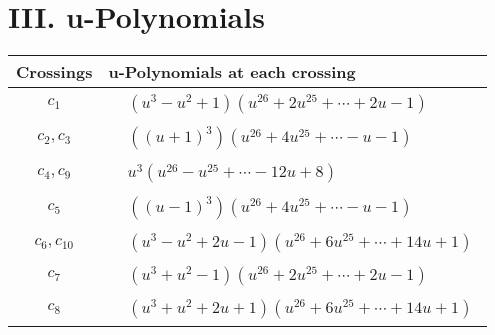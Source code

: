 \documentclass[1p]{elsarticle_modified}
\theoremstyle{definition}
\begin{document}
\newpage\renewcommand{\arraystretch}{1}
\centering \section*{ III. u-Polynomials}
\begin{tabular}{m{50pt}|m{274pt}}
Crossings & \hspace{64pt}u-Polynomials at each crossing \\
\hline $$\begin{aligned}c_{1}\end{aligned}$$&$\begin{aligned}
&(u^3- u^2+1)(u^{26}+2 u^{25}+\cdots+2 u-1)
\end{aligned}$\\
\hline $$\begin{aligned}c_{2},c_{3}\end{aligned}$$&$\begin{aligned}
&((u+1)^3)(u^{26}+4 u^{25}+\cdots- u-1)
\end{aligned}$\\
\hline $$\begin{aligned}c_{4},c_{9}\end{aligned}$$&$\begin{aligned}
&u^3(u^{26}- u^{25}+\cdots-12 u+8)
\end{aligned}$\\
\hline $$\begin{aligned}c_{5}\end{aligned}$$&$\begin{aligned}
&((u-1)^3)(u^{26}+4 u^{25}+\cdots- u-1)
\end{aligned}$\\
\hline $$\begin{aligned}c_{6},c_{10}\end{aligned}$$&$\begin{aligned}
&(u^3- u^2+2 u-1)(u^{26}+6 u^{25}+\cdots+14 u+1)
\end{aligned}$\\
\hline $$\begin{aligned}c_{7}\end{aligned}$$&$\begin{aligned}
&(u^3+u^2-1)(u^{26}+2 u^{25}+\cdots+2 u-1)
\end{aligned}$\\
\hline $$\begin{aligned}c_{8}\end{aligned}$$&$\begin{aligned}
&(u^3+u^2+2 u+1)(u^{26}+6 u^{25}+\cdots+14 u+1)
\end{aligned}$\\
\hline
\end{tabular}\newpage\renewcommand{\arraystretch}{1}
\end{document}
